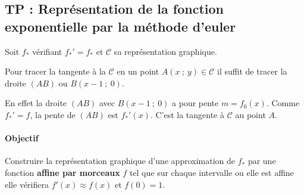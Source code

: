 \documentclass[main.tex]{subfiles}
\begin{document}
\subsection{TP  : Représentation de la fonction exponentielle par la méthode d'euler} 
\noindent
\parbox{0.68\linewidth}{
Soit $f_*$ vérifiant $f_*'=f_*$ et $\mathscr{C}$ sa représentation graphique.
\begin{eBox}
Pour tracer la tangente à la $\mathscr{C}$ en un point $A(x~;~y)\in\mathscr{C}$ il suffit de tracer la droite $(AB)$ ou $B(x-1~;~0)$.
\end{eBox}
En effet la droite $(AB)$ avec $B(x-1~;~0)$ a pour pente $m=f_0(x)$. Comme $f_*'=f$, la pente de $(AB)$ est $f_*'(x)$. C'est   la tangente à $\mathscr{C}$ au point $A$.%
}
\hfill 
\parbox{0.3\linewidth}{
}

\paragraph{Objectif} Construire la représentation graphique d'une approximation de  $f_*$ par une fonction \textbf{affine par morceaux} $f$ tel que sur chaque intervalle ou elle est affine elle vérifiera $f'(x)\approx f(x)$ et $f(0)=1$.
\end{document}

